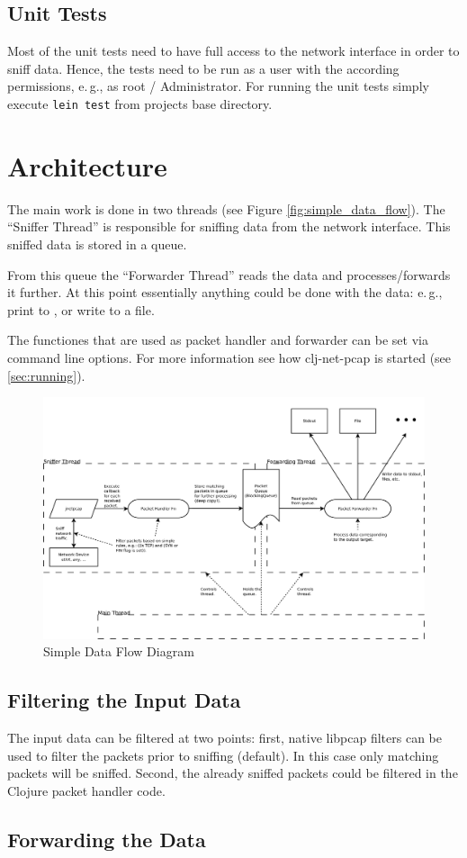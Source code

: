 \documentclass[11pt,a4paper,parskip=half]{scrartcl}
\newcommand{\programname}{{clj-net-pcap}}
\begin{document}
\subsection{Unit Tests}
Most of the unit tests need to have full access to the network interface in order to sniff data.
Hence, the tests need to be run as a user with the according permissions, e.\,g., as root / Administrator.
For running the unit tests simply execute \texttt{lein test} from projects base directory.

\section{Architecture}
The main work is done in two threads (see Figure \vref{fig:simple_data_flow}).
The ``Sniffer Thread'' is responsible for sniffing data from the network interface.
This sniffed data is stored in a queue.

From this queue the ``Forwarder Thread'' reads the data and processes/forwards it further.
At this point essentially anything could be done with the data:
e.\,g., print to , or write to a file.

The functiones that are used as packet handler and forwarder can be set via command line options.
For more information see how \programname{} is started (see \vref{sec:running}).

\begin{figure} 
  \centering
  \includegraphics[width=\textwidth]{diagrams/simple_data_flow}
  \caption{Simple Data Flow Diagram}
  \label{fig:simple_data_flow}
\end{figure}

\subsection{Filtering the Input Data}
The input data can be filtered at two points:
first, native libpcap filters can be used to filter the packets prior to sniffing (default).
In this case only matching packets will be sniffed.
Second, the already sniffed packets could be filtered in the Clojure packet handler code.

\subsection{Forwarding the Data}

{}

\end{document}
